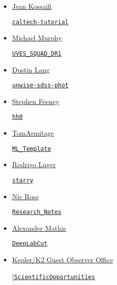 \documentclass[11pt,a4paper]{article}
\begin{document}
\begin{itemize}
\item \href{https://github.com/JeanKossaifi}{Jean Kossaifi}
  \begin{itemize}
    \href{https://github.com/JeanKossaifi/caltech-tutorial}{{\tt caltech-tutorial}}
  \end{itemize}
  
\item \href{https://github.com/MTMurphy77/}{Michael Murphy}
  \begin{itemize}
    \href{https://github.com/MTMurphy77/UVES_SQUAD_DR1}{\tt UVES\_SQUAD\_DR1}
  \end{itemize}

\item \href{https://github.com/dstndstn}{Dustin Lang}
  \begin{itemize}
   \href{https://github.com/dstndstn/unwise-sdss-phot}{\tt unwise-sdss-phot}
   \end{itemize}

\item \href{https://github.com/sfeeney}{Stephen Feeney}
  \begin{itemize}
    \href{https://github.com/sfeeney/hh0}{{\tt hh0}}
  \end{itemize}
  
\item \href{https://github.com/TomArmitage}{TomArmitage}
  \begin{itemize}
    \href{https://github.com/TomArmitage/ML\_Template}{{\tt ML\_Template}}
  \end{itemize}

\item \href{https://github.com/rodluger}{Rodrigo Luger}
  \begin{itemize}
    \href{https://github.com/rodluger/starry}{{\tt starry}}
  \end{itemize}

\item \href{https://github.com/d80b2t}{Nic Ross}
  \begin{itemize}
    \href{https://github.com/d80b2t/Research\_Notes}{\tt Research\_Notes}
  \end{itemize}

\item \href{https://github.com/AlexEMG}{Alexander Mathis}
  \begin{itemize}
    \href{https://github.com/AlexEMG/DeepLabCut}{\tt DeepLabCut} 
  \end{itemize}

\item \href{https://github.com/KeplerGO/}{Kepler/K2 Guest Observer Office}
  \begin{itemize}
    \href{https://github.com/KeplerGO/ScientificOpportunities}{[\tt ScientificOpportunities}
  \end{itemize}


\end{itemize}
\end{document}
